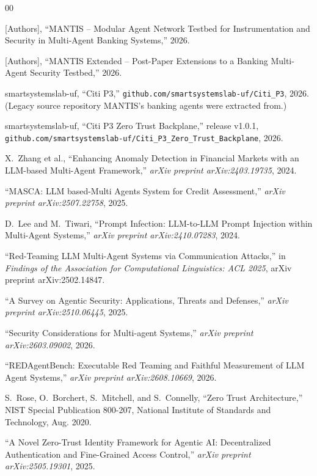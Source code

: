 \documentclass[conference]{IEEEtran}
\begin{document}
\begin{thebibliography}{00}

[Authors], ``MANTIS -- Modular Agent Network Testbed for Instrumentation and Security in Multi-Agent Banking Systems,'' 2026.

[Authors], ``MANTIS Extended -- Post-Paper Extensions to a Banking Multi-Agent Security Testbed,'' 2026.

smartsystemslab-uf, ``Citi P3,'' \texttt{github.com/smartsystemslab-uf/Citi\_P3}, 2026. (Legacy source repository MANTIS's banking agents were extracted from.)

smartsystemslab-uf, ``Citi P3 Zero Trust Backplane,'' release v1.0.1, \texttt{github.com/smartsystemslab-uf/Citi\_P3\_Zero\_Trust\_Backplane}, 2026.

X.~Zhang et al., ``Enhancing Anomaly Detection in Financial Markets with an LLM-based Multi-Agent Framework,'' \emph{arXiv preprint arXiv:2403.19735}, 2024.

``MASCA: LLM based-Multi Agents System for Credit Assessment,'' \emph{arXiv preprint arXiv:2507.22758}, 2025.

D.~Lee and M.~Tiwari, ``Prompt Infection: LLM-to-LLM Prompt Injection within Multi-Agent Systems,'' \emph{arXiv preprint arXiv:2410.07283}, 2024.

``Red-Teaming LLM Multi-Agent Systems via Communication Attacks,'' in \emph{Findings of the Association for Computational Linguistics: ACL 2025}, arXiv preprint arXiv:2502.14847.

``A Survey on Agentic Security: Applications, Threats and Defenses,'' \emph{arXiv preprint arXiv:2510.06445}, 2025.

``Security Considerations for Multi-agent Systems,'' \emph{arXiv preprint arXiv:2603.09002}, 2026.

``REDAgentBench: Executable Red Teaming and Faithful Measurement of LLM Agent Systems,'' \emph{arXiv preprint arXiv:2608.10669}, 2026.

S.~Rose, O.~Borchert, S.~Mitchell, and S.~Connelly, ``Zero Trust Architecture,'' NIST Special Publication 800-207, National Institute of Standards and Technology, Aug. 2020.

``A Novel Zero-Trust Identity Framework for Agentic AI: Decentralized Authentication and Fine-Grained Access Control,'' \emph{arXiv preprint arXiv:2505.19301}, 2025.

\end{thebibliography}
\vspace{12pt}
\end{document}
